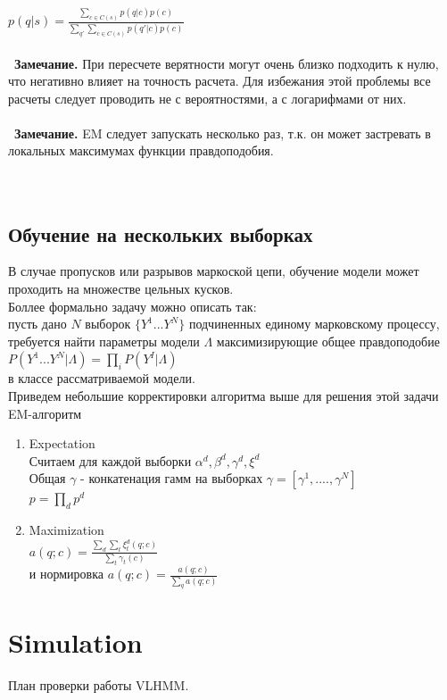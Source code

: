 \documentclass{matmex-diploma-custom}
\begin{document}
{$ p(q|s) = \frac{\sum_{c \in C(s)} {p(q|c)p(c)}}{\sum_{q'}\sum_{c \in C(s)} {p(q'|c)p(c)}} $ 
\\\\\
\textbf{Замечание.} При пересчете верятности могут очень близко подходить к нулю, что негативно влияет на точность расчета. Для избежания этой проблемы все расчеты следует проводить не с вероятностями, а с логарифмами от них.
\\\\\
\textbf{Замечание.} EM следует запускать несколько раз, т.к. он может застревать в локальных максимумах функции правдоподобия.
\\\\\
\subsection{Обучение на нескольких выборках}
В случае пропусков или разрывов маркоской цепи, обучение модели может проходить на множестве цельных кусков.
\\
Боллее формально задачу можно описать так: 
\\
пусть дано $ N $ выборок $ \{Y^{1} ... Y^{N}\}$ подчиненных единому марковскому процессу, требуется найти параметры модели $\Lambda$ максимизирующие общее правдоподобие 
\\
$P(Y^{1} ... Y^{N}| \Lambda) = \prod_{i}{P(Y^{I}|\Lambda)}$ 
\\в классе рассматриваемой модели.
\\
Приведем небольшие корректировки алгоритма выше для решения этой задачи
\\
EM-алгоритм
\begin{enumerate}
\item Expectation
\\
Считаем для каждой выборки  $\alpha^{d}, \beta^{d}, \gamma^{d}, \xi^{d}$
\\
Общая $\gamma$ - конкатенация гамм на выборках
$ \gamma = [\gamma^{1}, .... ,\gamma^{N}] $
\\
$ p = \prod_{d}{p^{d}}$
\item Maximization
\\
$ a(q;c) = \frac{\sum_{d}{\sum_{t}{\xi^{d}_{t}(q;c)}}}{\sum_{t}{\gamma_{t}(c)}} $
\\
и нормировка
$ a(q;c) = \frac{a(q;c)}{\sum_{q}{a(q;c)}} $
\end{enumerate}

\section{Simulation}
План проверки работы VLHMM.
\begin{enumerate}


\end{enumerate}}
\end{document}
